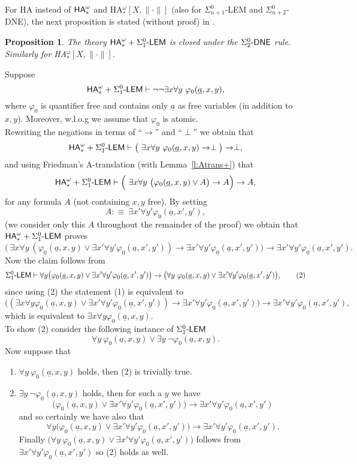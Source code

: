 \documentclass[1p]{elsarticle}
\newcommand{\usftext}[1]{\textsf{\upshape #1}}
\newcommand{\ha}{\ensuremath{{\usftext{HA}}^\omega}} %
\newcommand{\LEM}{\ensuremath{\Sigma^0_1\usftext{-LEM}}}
\newcommand{\DNE}{\ensuremath{\usftext{DNE}}}
\newcommand{\m}{\ensuremath{\usftext{-}}}
\newcommand{\tup}{\underline} %
\theoremstyle{plain}
\newtheorem{prop}[thm]{Proposition}
\theoremstyle{definition}
\theoremstyle{remark}
\renewenvironment{proof}[1][]{\noindent{\bf Proof{#1}. }}{\nopagebreak[4]{\hspace*{\fill}
  $\Box$              %
 }{\vspace{2ex}}}
\renewcommand{\phi}{\varphi}
\theoremstyle{definition}
\begin{document}
{For HA instead of 
$\ha_*$ and HA$_*^{\omega}[X,\|\cdot\|]$ 
(also for $\Sigma^0_{n+1}$-LEM and $\Sigma^0_{n+2}$-DNE), 
the next proposition is stated (without proof) in \cite{Hayashi/Nakata}. 
\begin{prop}\label{p:Atrans}
The theory $\ha_* + \LEM$ is closed under the $\Sigma^0_2\m\DNE$ rule. \\ 
Similarly for {\rm HA$_*^{\omega}[X,\|\cdot\|].$}
\end{prop}
\begin{proof} 
Suppose \[\ha_* + \LEM \vdash \neg\neg \exists x\forall y\ \phi_0(\tup a,x,y),\]
where $\phi_0$ is quantifier free and contains only $\tup a$ as free variables 
(in addition to $x,y$). 
Moreover, w.l.o.g we assume that $\phi_0$ is atomic.  \\
Rewriting the negations in terms of ``$\rightarrow$'' and ``$\perp$'' we obtain that
\[\ha_* + \LEM \vdash \big(\ \exists x\forall y\ \phi_0(\tup a,x,y)\rightarrow\perp\big)\rightarrow \perp,\]
and using Friedman's A-translation (with Lemma~\ref{l:Atrans+}) that
\[\ha_* + \LEM \vdash \Big(\ \exists x\forall y\ \big(\phi_0(\tup a,x,y) \vee A\big)\rightarrow A\Big)\rightarrow A,\]
for any formula $A$ (not containing $x,y$ free). By setting \[A:\equiv\ \exists x'\forall y' \phi_0(\tup a,x',y'),\]
(we consider only this $A$ throughout the remainder of the proof) we obtain that $\ha_* + \LEM$ proves
\[\big(\ \exists x\forall y\ (\phi_0(\tup a,x,y) \vee \exists x'\forall y' \phi_0(\tup a,x',y'))\rightarrow \exists x'\forall y' \phi_0(\tup a,x',y')\big)\rightarrow \exists x'\forall y' \phi_0(\tup a,x',y').\tag{1}\]
Now the claim follows from
\[
\LEM\vdash \forall y\big(\phi_0(\tup a,x,y) \vee \exists x'\forall y' \phi_0(\tup a,x',y') \big) \rightarrow \big(\forall y\ \phi_0(\tup a,x,y) \vee \exists x'\forall y' \phi_0(\tup a,x',y')\big),
\tag{2}
\]
since using (2) the statement (1) is equivalent to
\[  \big((\exists x \forall y \phi_0(\tup a,x,y) \vee \exists x'\forall y' \phi_0(\tup a,x',y'))\rightarrow \exists x'\forall y' \phi_0(\tup a,x',y')\big)\rightarrow \exists x'\forall y' \phi_0(\tup a,x',y'),\]
which is equivalent to $\exists x\forall y \phi_0(\tup a,x,y)$.\\
To show (2) consider the following instance of $\LEM$
\[
\forall y\ \phi_0(\tup a,x,y) \vee \exists y\ \neg\phi_0(\tup a,x,y).
\]
Now suppose that
\begin{enumerate}
\item $\forall y\ \phi_0(\tup a,x,y)$ holds, then (2) is trivially true.
\item $\exists y\ \neg \phi_0(\tup a,x,y)$ holds, then for such a $y$ we have
\[
\big(\phi_0(\tup a,x,y) \vee \exists x'\forall y' \phi_0(\tup a,x',y') \big) \rightarrow \exists x'\forall y' \phi_0(\tup a,x',y')
\]
and so certainly we have also that
\[
\forall y\big(\phi_0(\tup a,x,y) \vee \exists x'\forall y' \phi_0(\tup a,x',y') \big) \rightarrow \exists x'\forall y' \phi_0(\tup a,x',y').
\]
Finally $\big(\forall y\ \phi_0(\tup a,x,y) \vee \exists x'\forall y' \phi_0(\tup a,x',y')\big)$ follows from $\exists x'\forall y' \phi_0(\tup a,x',y')$ so (2) holds as well.
\end{enumerate}
\end{proof}

}
\end{document}
